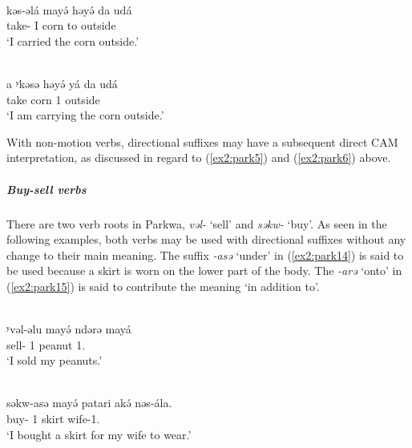 \ex\label{ex2:park11}
 \\
\gll kəs-əlá mayə́ həyə́ da udá \\
take- I corn to outside \\
\glt `I carried the corn outside.'

\ex\label{ex2:park12}
 \\
\gll a ʸkəsə həyə́ yá da udá \\
 take corn 1  outside \\
\glt `I am carrying the corn outside.'
\z 

With non-motion verbs, directional suffixes may have a subsequent direct CAM interpretation, as discussed in regard to (\ref{ex2:park5}) and (\ref{ex2:park6}) above.




\subparagraph{Buy-sell verbs}

There are two verb roots in Parkwa, \textit{vəl-} `sell' and \textit{səkw-} `buy'. As seen in the following examples, both verbs may be used with directional suffixes without any change to their main meaning. The suffix \textit{-asə} `under' in (\ref{ex2:park14}) is said to be used because a skirt is worn on the lower part of the body. The \textit{-arə} `onto' in (\ref{ex2:park15}) is said to contribute the meaning `in addition to'. 

\ea\label{ex2:park13}
 \\
\gll ʸvəl-əlu mayə́ ndərə mayá 	\\
sell- 1 peanut 1.	\\
\glt `I sold my peanuts.'

\ex\label{ex2:park14}
 \\
\gll səkw-asə mayə́ patari akə́ nəs-ála. \\
buy- 1 skirt  wife-1.	\\
\glt `I bought a skirt for my wife to wear.'


